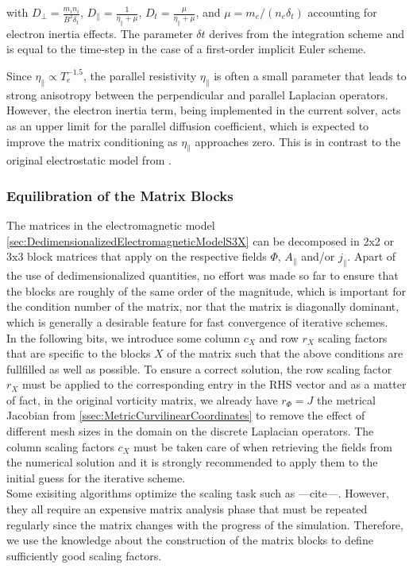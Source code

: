 with $D_\perp = \frac{m_i n_i}{B^2 \delta_t}$, $D_\parallel = \frac{1}{\eta_\parallel + \mu}$, $D_t = \frac{\mu}{\eta_\parallel + \mu}$, and $\mu = m_e / (n_e \delta_t)$ accounting for electron inertia effects. The parameter $\delta t$ derives from the integration scheme and is equal to the time-step in the case of a first-order implicit Euler scheme. \newline

Since $\eta_\parallel \propto T_e^{-1.5}$, the parallel resistivity $\eta_\parallel$ is often a small parameter that leads to strong anisotropy between the perpendicular and parallel Laplacian operators. However, the electron inertia term, being implemented in the current solver, acts as an upper limit for the parallel diffusion coefficient, which is expected to improve the matrix conditioning as $\eta_\parallel$ approaches zero. This is in contrast to the original electrostatic model from \cite{Bufferand2021}. \newline


\subsubsection{Equilibration of the Matrix Blocks}
\label{ssec:equilibrationBLockMatrices}
The matrices in the electromagnetic model \autoref{sec:DedimensionalizedElectromagneticModelS3X} can be decomposed in 2x2 or 3x3 block matrices that apply on the respective fields $\Phi$, $A_\parallel$ and/or $j_\parallel$. Apart of the use of dedimensionalized quantities, no effort was made so far to ensure that the blocks are roughly of the same order of the magnitude, which is important for the condition number of the matrix, nor that the matrix is diagonally dominant, which is generally a desirable feature for fast convergence of iterative schemes. \\
In the following bits, we introduce some column $c_X$ and row $r_X$ scaling factors that are specific to the blocks $X$ of the matrix such that the above conditions are fullfilled as well as possible. To ensure a correct solution, the row scaling factor $r_X$ must be applied to the corresponding entry in the RHS vector and as a matter of fact, in the original vorticity matrix, we already have $r_\Phi = J$ the metrical Jacobian from \autoref{ssec:MetricCurvilinearCoordinates} to remove the effect of different mesh sizes in the domain on the discrete Laplacian operators. The column scaling factors $c_X$ must be taken care of when retrieving the fields from the numerical solution and it is strongly recommended to apply them to the initial guess for the iterative scheme. \\ 
Some exisiting algorithms optimize the scaling task such as ---cite---. However, they all require an expensive matrix analysis phase that must be repeated regularly since the matrix changes with the progress of the simulation. Therefore, we use the knowledge about the construction of the matrix blocks to define sufficiently good scaling factors. \\

